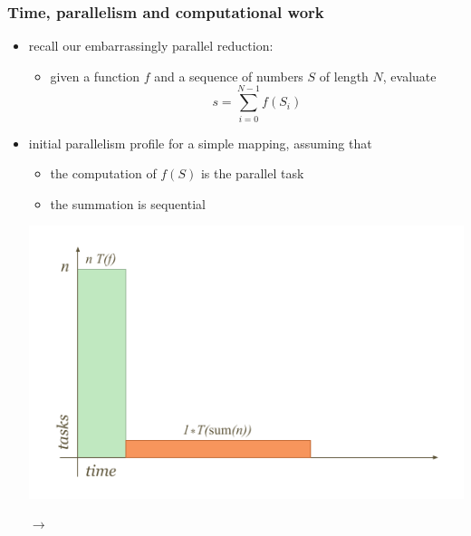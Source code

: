 %
%
%
%


\begin{frame}[fragile]
%
  \frametitle{Time, parallelism and computational work}
%
  \begin{itemize}
  \item recall our embarrassingly parallel reduction: 
    \begin{itemize}
    \item given a function $f$ and a sequence of numbers $S$ of length $N$, evaluate
    \[
    s = \sum_{i=0}^{N-1}f(S_{i})
    \]
    \end{itemize}
%
  \item initial parallelism profile for a simple mapping, assuming that
    \begin{itemize}
    \item the computation of $f(S)$ is the parallel task
    \item the summation is sequential
    \end{itemize}
%
    \begin{minipage}{.45\linewidth}
      \includegraphics[scale=0.6]{figures/reduction-parallel-work.pdf}
    \end{minipage}
    $\longrightarrow$
    \begin{minipage}{.45\linewidth}

\end{minipage}
\end{itemize}
\end{frame}
